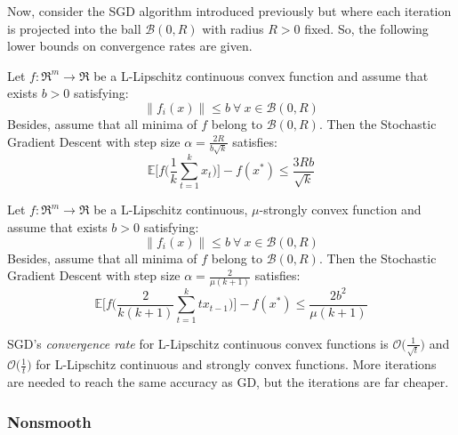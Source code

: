 
Now, consider the SGD algorithm introduced previously but where each iteration is projected into the ball $\mathcal{B}(0, R)$ with radius $R > 0$ fixed. So, the following lower bounds on convergence rates are given.

\begin{theorem} \label{thm:cvx_sgd_convergence}
Let $f: \Re^m \rightarrow \Re$ be a L-Lipschitz continuous convex function and assume that exists $b > 0$ satisfying:
$$
\| f_i(x) \| \leq b \ \forall \ x \in \mathcal{B}(0, R)
$$
Besides, assume that all minima of $f$ belong to $\mathcal{B}(0, R)$. Then the Stochastic Gradient Descent with step size $\displaystyle \alpha = \frac{2R}{b\sqrt{k}}$ satisfies:
$$
\mathbb{E}\Bigg[f\Bigg(\frac{1}{k} \sum_{t=1}^k x_t\Bigg)\Bigg] - f(x^*) \leq \frac{3Rb}{\sqrt{k}}
$$
\end{theorem}

\begin{theorem} \label{thm:str_cvx_sgd_convergence}
Let $f: \Re^m \rightarrow \Re$ be a L-Lipschitz continuous, $\mu$-strongly convex function and assume that exists $b > 0$ satisfying:
$$
\| f_i(x) \| \leq b \ \forall \ x \in \mathcal{B}(0, R)
$$
Besides, assume that all minima of $f$ belong to $\mathcal{B}(0, R)$. Then the Stochastic Gradient Descent with step size $\displaystyle \alpha = \frac{2}{\mu(k+1)}$ satisfies:
$$
\mathbb{E}\Bigg[f\Bigg(\frac{2}{k(k+1)} \sum_{t=1}^k t x_{t-1}\Bigg)\Bigg] - f(x^*) \leq \frac{2b^2}{\mu(k+1)}
$$
\end{theorem}

SGD’s \emph{convergence rate} for L-Lipschitz continuous convex functions is $\displaystyle \mathcal{O}\bigg(\frac{1}{\sqrt{t}}\bigg)$ and $\displaystyle \mathcal{O}\bigg(\frac{1}{t}\bigg)$ for L-Lipschitz continuous and strongly convex functions. More iterations are needed to reach the same accuracy as GD, but the iterations are far cheaper.


\subsubsection{Nonsmooth}

